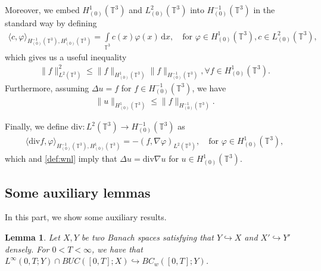 \documentclass[reqno,a4paper,11pt]{amsart}
\theoremstyle{plain}
\newtheorem{lemma}[theorem]{Lemma}
\numberwithin{equation}{section}
\begin{document}
	
	
	Moreover, we embed $H_{(0)}^{1}(\mathbb{T}^{3})$ and $L^{2}_{(0)}(\mathbb{T}^{3})$ into $H_{(0)}^{-1}(\mathbb{T}^{3})$ in the standard way by defining
	\begin{align*}
		\langle c,\varphi\rangle_{H_{(0)}^{-1}(\mathbb{T}^{3}),H_{(0)}^{1}(\mathbb{T}^{3})}=\int\limits_{\mathbb{T}^{3}} c(x)\varphi(x)\,\mathrm dx, \quad\text{for $\varphi\in H_{(0)}^{1}(\mathbb{T}^{3}),c\in L^{2}_{(0)}(\mathbb{T}^{3})$},
	\end{align*}
	which gives us a useful inequality
	\begin{align}\label{HHH}
		\|f\|_{L^{2}(\mathbb{T}^{3})}^{2}\leq \|f\|_{H_{(0)}^{1}(\mathbb{T}^{3})} \|f\|_{H_{(0)}^{-1}(\mathbb{T}^{3})},\forall f\in H_{(0)}^{1}(\mathbb{T}^{3}).
	\end{align}
	Furthermore, assuming $\Delta u=f$ for $f\in H_{(0)}^{-1}(\mathbb{T}^{3})$, we have
	\begin{align*}
		\|u\|_{H_{(0)}^{1}(\mathbb{T}^{3})}\leq  \|f\|_{H_{(0)}^{-1}(\mathbb{T}^{3})}.
	\end{align*}



Finally, we define $\mathrm{div}:L^{2}(\mathbb{T}^{3})\rightarrow H_{(0)}^{-1}(\mathbb{T}^{3})$ as
\begin{align}\label{def:div}
	\langle \mathrm{div} f,\varphi \rangle_{H_{(0)}^{-1}(\mathbb{T}^{3}),H_{(0)}^{1}(\mathbb{T}^{3})}=-(f,\nabla\varphi)_{L^{2}(\mathbb{T}^{3})}, \quad\text{for $\varphi\in H_{(0)}^{1}(\mathbb{T}^{3})$},
\end{align}
which and \eqref{def:wnl} imply that $\Delta u=\mathrm{div}\nabla u$ for $u\in  H_{(0)}^{1}(\mathbb{T}^{3})$.

\subsection{Some auxiliary lemmas}
In this part, we show some auxiliary results.
\begin{lemma}\label{lem1}\cite {AH}
	Let $X,Y$ be two Banach spaces satisfying that $Y\hookrightarrow X$ and $X'\hookrightarrow Y'$ densely. For $0<T<\infty$, we have that $L^{\infty}(0,T;Y)\cap BUC([0,T];X)\hookrightarrow BC_{w}([0,T];Y)$.
\end{lemma}
\end{document}
